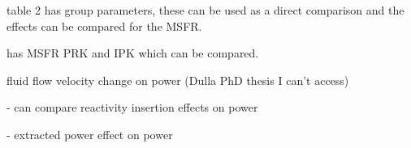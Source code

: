 \cite{li2015transient} table 2 has group parameters, these can be used as a direct comparison and the effects can be compared for the \gls{MSFR}.

\cite{merle2015physical} has MSFR PRK and IPK which can be compared.

fluid flow velocity change on power (Dulla PhD thesis I can't access)

\cite{laureau2015coupled} - can compare reactivity insertion effects on power

\cite{merle2015physical} - extracted power effect on power